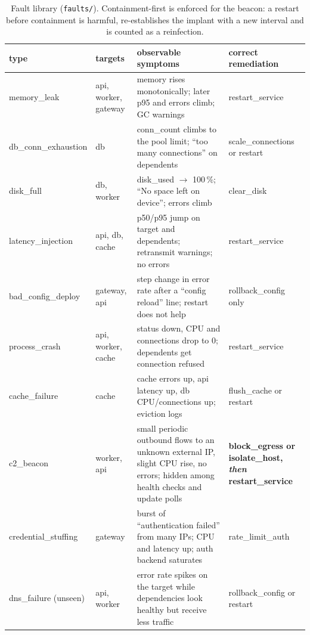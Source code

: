 \documentclass[11pt,a4paper]{article}
\newcommand{\code}[1]{\texttt{#1}}
\newcommand{\pct}[1]{#1\,\%}
\begin{document}
\begin{table}[H]
\centering\footnotesize
\caption{Fault library (\code{faults/}). Containment-first is enforced for the beacon: a restart
before containment is harmful, re-establishes the implant with a new interval and is counted as a
reinfection.}
\label{tab:faults}
\begin{tabularx}{\textwidth}{l >{\raggedright\arraybackslash}p{2.2cm} X >{\raggedright\arraybackslash}p{3.1cm}}
\toprule
type & targets & observable symptoms & correct remediation \\
\midrule
memory\_leak & api, worker, gateway & memory rises monotonically; later p95 and errors climb; GC warnings & restart\_service \\
db\_conn\_exhaustion & db & conn\_count climbs to the pool limit; ``too many connections'' on dependents & scale\_connections or restart \\
disk\_full & db, worker & disk\_used $\to$ \pct{100}; ``No space left on device''; errors climb & clear\_disk \\
latency\_injection & api, db, cache & p50/p95 jump on target and dependents; retransmit warnings; no errors & restart\_service \\
bad\_config\_deploy & gateway, api & step change in error rate after a ``config reload'' line; restart does not help & rollback\_config only \\
process\_crash & api, worker, cache & status down, CPU and connections drop to 0; dependents get connection refused & restart\_service \\
cache\_failure & cache & cache errors up, api latency up, db CPU/connections up; eviction logs & flush\_cache or restart \\
\addlinespace
\textcolor{attack}{c2\_beacon} & worker, api & small periodic outbound flows to an unknown external IP, slight CPU rise, no errors; hidden among health checks and update polls & \textbf{block\_egress or isolate\_host, \emph{then} restart\_service} \\
\textcolor{attack}{credential\_stuffing} & gateway & burst of ``authentication failed'' from many IPs; CPU and latency up; auth backend saturates & rate\_limit\_auth \\
\addlinespace
dns\_failure (unseen) & api, worker & error rate spikes on the target while dependencies look healthy but receive less traffic & rollback\_config or restart \\
\bottomrule
\end{tabularx}
\end{table}
\end{document}
